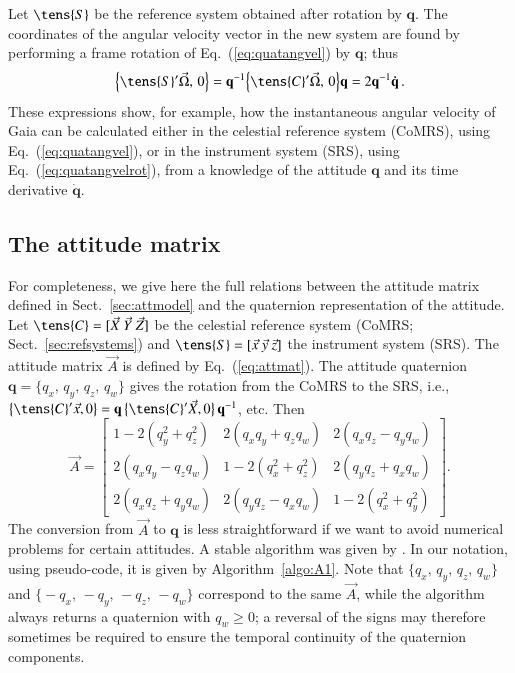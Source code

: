 \documentclass[structabstract]{aa}
\newcommand{\quat}[1]{\mathbf{#1}}
\begin{document}
Let $\tens{S}$ be the reference system obtained after rotation by 
$\quat{q}$. The coordinates of the angular velocity vector in the new 
system are found by performing a frame rotation of 
Eq.~(\ref{eq:quatangvel}) by $\quat{q}$; thus
\begin{equation}\label{eq:quatangvelrot}
\Bigl\{\tens{S}'\vec{\Omega},\,0\Bigr\}=
\quat{q}^{-1}\Bigl\{\tens{C}'\vec{\Omega},\,0\Bigr\}\quat{q}=
2\quat{q}^{-1}\quat{\dot{q}} \, .
\end{equation}
These expressions show, for example, how the instantaneous angular velocity
of Gaia can be calculated either in the celestial reference system (CoMRS),
using Eq.~(\ref{eq:quatangvel}), or in the instrument system (SRS),
using Eq.~(\ref{eq:quatangvelrot}), from a knowledge of the attitude
$\quat{q}$ and its time derivative $\quat{\dot{q}}$.


\subsection{The attitude matrix}\label{sec:attmat}

For completeness, we give here the full relations
between the attitude matrix defined in Sect.~\ref{sec:attmodel} and
the quaternion representation of the attitude. Let
$\tens{C}=[\vec{X}~\vec{Y}~\vec{Z}]$ be the celestial reference system 
(CoMRS; Sect.~\ref{sec:refsystems}) and $\tens{S}=[\vec{x}~\vec{y}~\vec{z}]$ 
the instrument system (SRS). The attitude matrix $\vec{A}$ is defined by
Eq.~(\ref{eq:attmat}). The attitude quaternion
$\quat{q}=\bigl\{q_x,\,q_y,\,q_z,\,q_w\bigr\}$ gives the 
rotation from the CoMRS to the SRS, i.e., 
$\bigl\{\tens{C}'\vec{x},0\bigr\}=
\quat{q}\,\bigl\{\tens{C}'\vec{X},0\bigr\}\,\quat{q}^{-1}$, etc. Then
\begin{equation}\label{eq:quat2mat}
\vec{A} =
\begin{bmatrix}
    1-2(q_y^2+q_z^2) & 2(q_xq_y+q_zq_w) &  2(q_xq_z-q_yq_w) \\
    2(q_xq_y-q_zq_w) & 1-2(q_x^2+q_z^2) &  2(q_yq_z+q_xq_w) \\
    2(q_xq_z+q_yq_w) & 2(q_yq_z-q_xq_w) &  1-2(q_x^2+q_y^2)
\end{bmatrix} .
\end{equation}
The conversion from $\vec{A}$ to $\quat{q}$ is less straightforward
if we want to avoid numerical problems for certain attitudes. A stable
algorithm was given by \citet{klumpp1976}. In our notation, using
pseudo-code, it is given by Algorithm~\ref{algo:A1}.
Note that $\bigl\{q_x,\,q_y,\,q_z,\,q_w\bigr\}$ and 
$\bigl\{-q_x,\,-q_y,\,-q_z,\,-q_w\bigr\}$
correspond to the same $\vec{A}$, while the algorithm always returns
a quaternion with $q_w\ge 0$; a reversal of the signs may therefore
sometimes be required to ensure the temporal continuity of the 
quaternion components.
\end{document}
